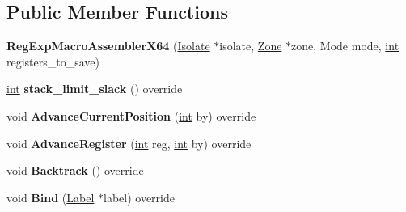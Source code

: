 \subsection*{Public Member Functions}
\begin{DoxyCompactItemize}
\item 
\mbox{\label{classv8_1_1internal_1_1RegExpMacroAssemblerX64_a318cbce38085b779ab2b2e09e3d346c3}} 
{\bfseries Reg\+Exp\+Macro\+Assembler\+X64} (\mbox{\hyperlink{classv8_1_1internal_1_1Isolate}{Isolate}} $\ast$isolate, \mbox{\hyperlink{classv8_1_1internal_1_1Zone}{Zone}} $\ast$zone, Mode mode, \mbox{\hyperlink{classint}{int}} registers\+\_\+to\+\_\+save)
\item 
\mbox{\label{classv8_1_1internal_1_1RegExpMacroAssemblerX64_a869666b145efa3dae249e8b5d8a12af4}} 
\mbox{\hyperlink{classint}{int}} {\bfseries stack\+\_\+limit\+\_\+slack} () override
\item 
\mbox{\label{classv8_1_1internal_1_1RegExpMacroAssemblerX64_a9f77f20047d408d7884a954388e4e37d}} 
void {\bfseries Advance\+Current\+Position} (\mbox{\hyperlink{classint}{int}} by) override
\item 
\mbox{\label{classv8_1_1internal_1_1RegExpMacroAssemblerX64_a6ce0259a705975f3adf259ae804943f2}} 
void {\bfseries Advance\+Register} (\mbox{\hyperlink{classint}{int}} reg, \mbox{\hyperlink{classint}{int}} by) override
\item 
\mbox{\label{classv8_1_1internal_1_1RegExpMacroAssemblerX64_aa5373f7629f9db4741f011c8c76149a5}} 
void {\bfseries Backtrack} () override
\item 
\mbox{\label{classv8_1_1internal_1_1RegExpMacroAssemblerX64_a4173f98f7267b8acc264554de6ffa155}} 
void {\bfseries Bind} (\mbox{\hyperlink{classv8_1_1internal_1_1Label}{Label}} $\ast$label) override
\item 
\mbox{\label{classv8_1_1internal_1_1RegExpMacroAssemblerX64_ae4c9a34f221b8d10178d5537e51e3ff3}} 

\end{DoxyCompactItemize}
